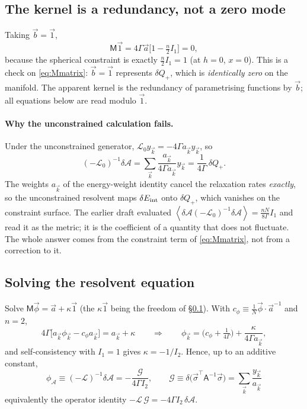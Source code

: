 \documentclass[11pt,a4paper]{article}
\newcommand{\bk}{\vec k}
\newcommand{\avg}[1]{\left\langle #1 \right\rangle}
\newcommand{\Ac}{\mathcal{A}}
\newcommand{\Gc}{\mathcal{G}}
\newcommand{\Lc}{\mathcal{L}}
\newcommand{\Mc}{\mathsf{M}}
\newcommand{\bk}{\vec k}
\newcommand{\bs}{\vec\sigma}
\newcommand{\avg}[1]{\left\langle #1 \right\rangle}
\begin{document}
\subsection{The kernel is a redundancy, not a zero mode}
\label{sec:kernel}
Taking $\vec b=\vec 1$,
\begin{equation}
  \Mc\vec1=4\Gamma\vec a\big[1-\tfrac n2 I_1\big]=0 ,
\end{equation}
because the spherical constraint is exactly $\tfrac n2I_1=1$ (at $h=0$, $x=0$). This is a
check on \eqref{eq:Mmatrix}: $\vec b=\vec1$ represents $\delta Q_+$, which is
\emph{identically zero} on the manifold. The apparent kernel is the redundancy of
parametrising functions by $\vec b$; all equations below are read modulo $\vec1$.

\paragraph{Why the unconstrained calculation fails.} Under the unconstrained generator,
$\Lc_0y_{\bk}=-4\Gamma a_{\bk}y_{\bk}$, so
\begin{equation}
  (-\Lc_0)^{-1}\delta\Ac=\sum_{\bk}\frac{a_{\bk}}{4\Gamma a_{\bk}}y_{\bk}
   =\frac{1}{4\Gamma}\,\delta Q_+ .
\end{equation}
The weights $a_{\bk}$ of the energy-weight identity cancel the relaxation rates
\emph{exactly}, so the unconstrained resolvent maps $\delta E_{\rm int}$ onto $\delta Q_+$,
which vanishes on the constraint surface. The earlier draft evaluated
$\avg{\delta\Ac(-\Lc_0)^{-1}\delta\Ac}=\tfrac{nN}{8\Gamma}I_1$ and read it as the metric; it
is the coefficient of a quantity that does not fluctuate. The whole answer comes from the
constraint term of \eqref{eq:Mmatrix}, not from a correction to it.

\subsection{Solving the resolvent equation}
Solve $\Mc\vec\phi=\vec a+\kappa\vec1$ (the $\kappa\vec1$ being the freedom of
\S\ref{sec:kernel}). With $c_\phi\equiv\tfrac1N\vec\phi\cdot\vec a^{-1}$ and $n=2$,
\begin{equation}
  4\Gamma\big[a_{\bk}\phi_{\bk}-c_\phi a_{\bk}\big]=a_{\bk}+\kappa
  \qquad\Longrightarrow\qquad
  \phi_{\bk}=\Big(c_\phi+\tfrac{1}{4\Gamma}\Big)+\frac{\kappa}{4\Gamma a_{\bk}} ,
\end{equation}
and self-consistency with $I_1=1$ gives $\kappa=-1/I_2$. Hence, up to an additive constant,
\begin{equation}
  \boxed{\ \phi_{\Ac}\equiv(-\Lc)^{-1}\delta\Ac=-\frac{\Gc}{4\Gamma I_2},
   \qquad \Gc\equiv\delta\big(\bs^\top\mathsf A^{-1}\bs\big)=\sum_{\bk}\frac{y_{\bk}}{a_{\bk}}\ }
  \label{eq:phiA}
\end{equation}
equivalently the operator identity $-\Lc\,\Gc=-4\Gamma I_2\,\delta\Ac$.
\end{document}
